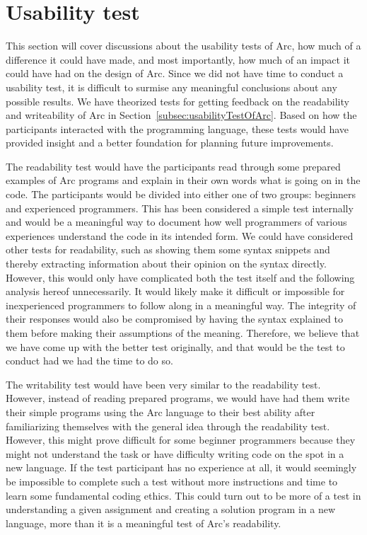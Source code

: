 \section{Usability test}\label{sec:discussion_usabilityTest}

This section will cover discussions about the usability tests of Arc, how much of a difference it could have made, and most importantly, how much of an impact it could have had on the design of Arc. Since we did not have time to conduct a usability test, it is difficult to surmise any meaningful conclusions about any possible results. We have theorized tests for getting feedback on the readability and writeability of Arc in Section~\ref{subsec:usabilityTestOfArc}. Based on how the participants interacted with the programming language, these tests would have provided insight and a better foundation for planning future improvements.

The readability test would have the participants read through some prepared examples of Arc programs and explain in their own words what is going on in the code. The participants would be divided into either one of two groups: beginners and experienced programmers. This has been considered a simple test internally and would be a meaningful way to document how well programmers of various experiences understand the code in its intended form. We could have considered other tests for readability, such as showing them some syntax snippets and thereby extracting information about their opinion on the syntax directly. However, this would only have complicated both the test itself and the following analysis hereof unnecessarily. It would likely make it difficult or impossible for inexperienced programmers to follow along in a meaningful way. The integrity of their responses would also be compromised by having the syntax explained to them before making their assumptions of the meaning. Therefore, we believe that we have come up with the better test originally, and that would be the test to conduct had we had the time to do so.

The writability test would have been very similar to the readability test. However, instead of reading prepared programs, we would have had them write their simple programs using the Arc language to their best ability after familiarizing themselves with the general idea through the readability test. However, this might prove difficult for some beginner programmers because they might not understand the task or have difficulty writing code on the spot in a new language. If the test participant has no experience at all, it would seemingly be impossible to complete such a test without more instructions and time to learn some fundamental coding ethics. This could turn out to be more of a test in understanding a given assignment and creating a solution program in a new language, more than it is a meaningful test of Arc's readability.

